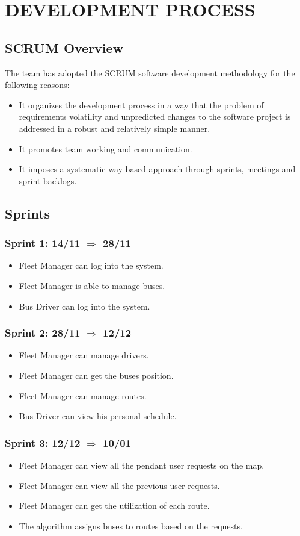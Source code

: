 \section{DEVELOPMENT PROCESS}
\subsection{SCRUM Overview}
The team has adopted the SCRUM software development methodology for the following reasons:
\begin{itemize}
	\item It organizes the development process in a way that the problem of requirements volatility and unpredicted changes to the software project is addressed in a robust and relatively simple manner.
	\item It promotes team working and communication.
	\item It imposes a systematic-way-based approach through sprints, meetings and sprint backlogs.
\end{itemize}

\subsection{Sprints}
\subsubsection{Sprint 1: 14/11 $\Rightarrow$ 28/11}
\begin{itemize}
	\item Fleet Manager can log into the system. 
	\item Fleet Manager is able to manage buses.
	\item Bus Driver can log into the system.	
\end{itemize}

\subsubsection{Sprint 2: 28/11 $\Rightarrow$ 12/12}
\begin{itemize}
	\item Fleet Manager can manage drivers.
	\item Fleet Manager can get the buses position.
	\item Fleet Manager can manage routes.
	\item Bus Driver can view his personal schedule.
\end{itemize}

\subsubsection{Sprint 3: 12/12 $\Rightarrow$ 10/01}
\begin{itemize}
	\item Fleet Manager can view all the pendant user requests on the map.
	\item Fleet Manager can view all the previous user requests.
	\item Fleet Manager can get the utilization of each route.
	\item The algorithm assigns buses to routes based on the requests.	
\end{itemize}

